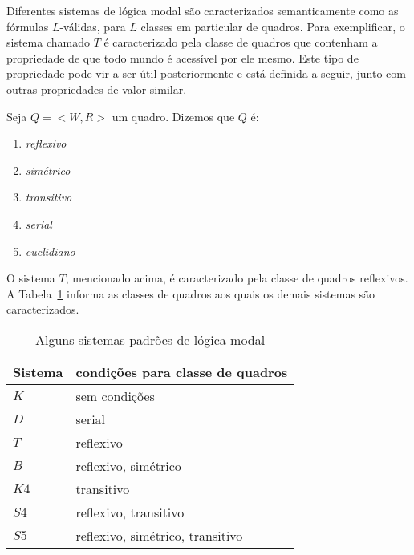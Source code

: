 Diferentes sistemas de lógica modal são caracterizados semanticamente como as
fórmulas $L$-válidas, para $L$ classes em particular de quadros. Para
exemplificar, o sistema chamado $T$ é caracterizado pela classe de quadros que
contenham a propriedade de que todo mundo é acessível por ele mesmo. Este tipo
de propriedade pode vir a ser útil posteriormente e está definida a seguir,
junto com outras propriedades de valor similar.

\begin{definition}
    Seja $Q = <W,R>$ um quadro. Dizemos que $Q$ é:
    \begin{enumerate}
        \item \textit{reflexivo}
        \item \textit{simétrico}
        \item \textit{transitivo}
        \item \textit{serial}
        \item \textit{euclidiano}
    \end{enumerate}
    
\end{definition}

O sistema $T$, mencionado acima, é caracterizado pela classe de quadros
reflexivos. A Tabela~\ref{table:condicoes_quadro} informa as classes de quadros
aos quais os demais sistemas são caracterizados.

\begin{table}
    \begin{center}
        \label{table:condicoes_quadro}
        \caption{Alguns sistemas padrões de lógica modal}
        \begin{tabular}{ll}
            \hline
            Sistema & condições para classe de quadros \\
            \hline
            $K$  & sem condições \\  
            $D$  & serial \\ 
            $T$  & reflexivo \\ 
            $B$  & reflexivo, simétrico\\ 
            $K4$ & transitivo \\  
            $S4$ & reflexivo, transitivo \\  
            $S5$ & reflexivo, simétrico, transitivo \\
            \hline
        \end{tabular}
    \end{center}
\end{table}


